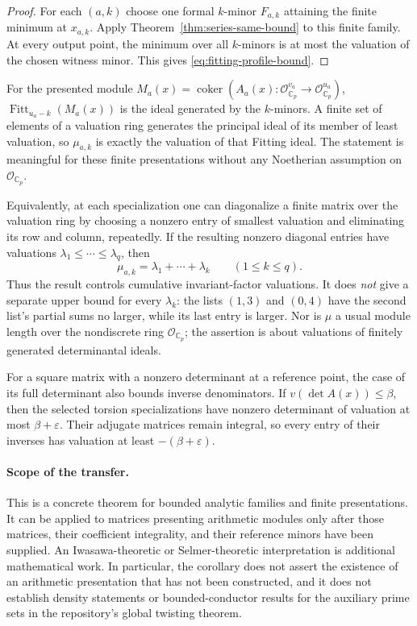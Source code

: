 \begin{proof}
For each $(a,k)$ choose one formal $k$-minor $F_{a,k}$ attaining the finite
minimum at $x_{a,k}$.  Apply Theorem~\ref{thm:series-same-bound} to this
finite family.  At every output point, the minimum over all $k$-minors is
at most the valuation of the chosen witness minor.  This gives
\eqref{eq:fitting-profile-bound}.
\end{proof}

For the presented module
$M_a(x)=\operatorname{coker}(A_a(x):\mathcal O_{\mathbb C_p}^{v_a}
\to\mathcal O_{\mathbb C_p}^{u_a})$,
$\operatorname{Fitt}_{u_a-k}(M_a(x))$ is the ideal generated by the
$k$-minors.  A finite set of elements of a valuation ring generates the
principal ideal of its member of least valuation, so $\mu_{a,k}$ is exactly
the valuation of that Fitting ideal.  The statement is meaningful for these
finite presentations without any Noetherian assumption on
$\mathcal O_{\mathbb C_p}$.

Equivalently, at each specialization one can diagonalize a finite matrix
over the valuation ring by choosing a nonzero entry of smallest valuation
and eliminating its row and column, repeatedly.  If the resulting nonzero
diagonal entries have valuations
$\lambda_1\leq\cdots\leq\lambda_q$, then
\[
 \mu_{a,k}=\lambda_1+\cdots+\lambda_k\qquad(1\leq k\leq q).
\]
Thus the result controls cumulative invariant-factor valuations.  It does
\emph{not} give a separate upper bound for every $\lambda_k$: the lists
$(1,3)$ and $(0,4)$ have the second list's partial sums no larger, while its
last entry is larger.  Nor is $\mu$ a usual module length over the
nondiscrete ring $\mathcal O_{\mathbb C_p}$; the assertion is about
valuations of finitely generated determinantal ideals.

For a square matrix with a nonzero determinant at a reference point, the
case of its full determinant also bounds inverse denominators.  If
$v(\det A(x))\leq\beta$, then the selected torsion specializations have
nonzero determinant of valuation at most $\beta+\varepsilon$.
Their adjugate matrices remain integral, so every entry of their inverses
has valuation at least $-(\beta+\varepsilon)$.

\paragraph{Scope of the transfer.}
This is a concrete theorem for bounded analytic families and finite
presentations.  It can be applied to matrices presenting arithmetic modules
only after those matrices, their coefficient integrality, and their
reference minors have been supplied.  An Iwasawa-theoretic or Selmer-theoretic
interpretation is additional mathematical work.  In particular, the
corollary does not assert the existence of an arithmetic presentation that
has not been constructed, and it does not establish density statements or
bounded-conductor results for the auxiliary prime sets in the repository's
global twisting theorem.
